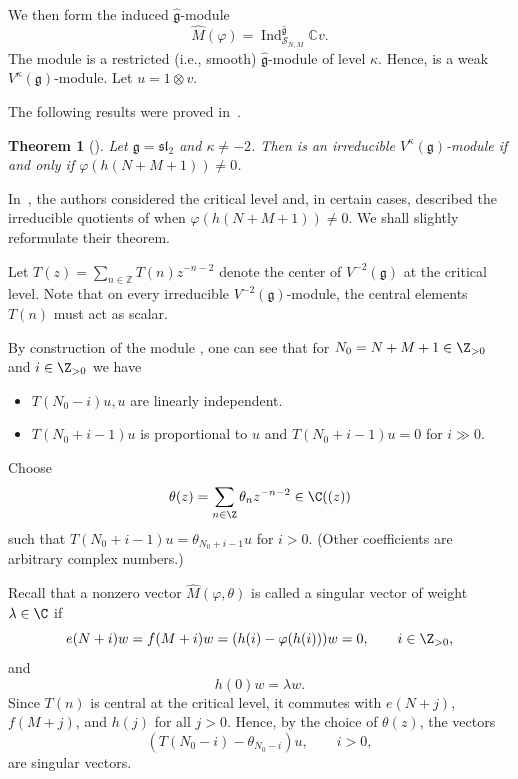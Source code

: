 \documentclass[pdftex]{sigma}
\numberwithin{equation}{section}
\newtheorem{Theorem}{Theorem}[section]
\theoremstyle{definition}
\newcommand{\1}{\textbf{1}}
\begin{document}
We then form the induced $\widehat{\mathfrak{g}}$-module
\[
 \widehat{M}(\varphi) = \operatorname{Ind}_{\mathcal{S}_{N,M}}^{\widehat{\mathfrak{g}}} \mathbb{C}v.
\]
The module  is a restricted (i.e., smooth) $\widehat{\mathfrak{g}}$-module of level $\kappa$.
Hence,  is a weak $V^{\kappa}(\mathfrak{g})$-module.
Let $u = 1 \otimes v$.

The following results were proved in~\cite[Theorem~1.1]{FGXZ}.

\begin{Theorem}[\cite{FGXZ}]\label{fgxz}
Let $\mathfrak{g} = \mathfrak{sl}_{2}$ and $\kappa \ne -2$.
Then  is an irreducible $V^{\kappa}(\mathfrak{g})$-module
if and only if $\varphi(h(N + M + 1)) \ne 0$.
\end{Theorem}

In~\cite[Theorem~1.2]{FGXZ}, the authors considered the critical level and, in certain cases,
described the irreducible quotients of  when $\varphi(h(N+M+1)) \ne 0$. We shall slightly reformulate their theorem.

Let
$
 T(z) = \sum_{n \in \mathbb{Z}} T(n) z^{-n-2}
$
denote the center of $V^{-2}(\mathfrak{g})$ at the critical level. Note that
on every irreducible $V^{-2}(\mathfrak{g})$-module, the central elements $T(n)$ must act as scalar.

By construction of the module , one can see that for $N_0 = N+M+1 \in {\Z}_{>0}$ and $i\in {\Z}_{> 0}$ we have
\begin{itemize}\itemsep=0pt
\item $T(N_0-i)u, u$ are linearly independent.
\item $T(N_0+ i-1)u$ is proportional to $u$ and $T(N_0+ i-1)u =0$ for $i \gg 0$.
 \end{itemize}
 Choose
\[ \theta(z) = \sum_{n\in {\Z}} \theta_n z^{-n-2} \in {\C} ((z)) \]
 such that $T(N_0+ i-1)u = \theta_{N_0+i-1} u$ for $i > 0$.
 (Other coefficients are arbitrary complex numbers.)

 Recall that a nonzero vector $\widehat{M}(\varphi, \theta)$ is called a singular vector of weight $\lambda\in\C$ if
\[
e(N+i)w=f(M+i)w=(h(i)-\varphi(h(i)))w=0, \qquad i\in\Z_{>0},
\]
and
\[
h(0)w=\lambda w.
\]
Since $T(n)$ is central at the critical level, it commutes with $e(N+j)$, $f(M+j)$, and $h(j)$ for all $j>0$. Hence, by the choice of $\theta(z)$, the vectors
\begin{equation}\label{singul}
(T(N_0-i)-\theta_{N_0-i})u, \qquad i>0,
\end{equation}
are singular vectors.
\end{document}
